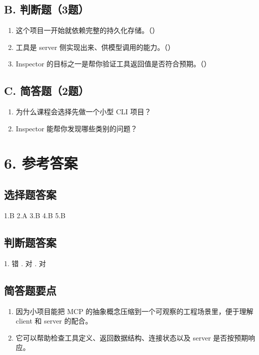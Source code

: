 \documentclass[UTF8,a4paper,11pt]{ctexart}
\begin{document}
\subsection*{B. 判断题（3题）}
\begin{enumerate}
  \item 这个项目一开始就依赖完整的持久化存储。（\quad）
  \item 工具是 server 侧实现出来、供模型调用的能力。（\quad）
  \item Inspector 的目标之一是帮你验证工具返回值是否符合预期。（\quad）
\end{enumerate}

\subsection*{C. 简答题（2题）}
\begin{enumerate}
  \item 为什么课程会选择先做一个小型 CLI 项目？
  \item Inspector 能帮你发现哪些类别的问题？
\end{enumerate}

\section*{6. 参考答案}
\subsection*{选择题答案}
1.B \quad 2.A \quad 3.B \quad 4.B \quad 5.B

\subsection*{判断题答案}
1. 错 . 对 . 对

\subsection*{简答题要点}
\begin{enumerate}
  \item 因为小项目能把 MCP 的抽象概念压缩到一个可观察的工程场景里，便于理解 client 和 server 的配合。
  \item 它可以帮助检查工具定义、返回数据结构、连接状态以及 server 是否按预期响应。
\end{enumerate}
\end{document}
